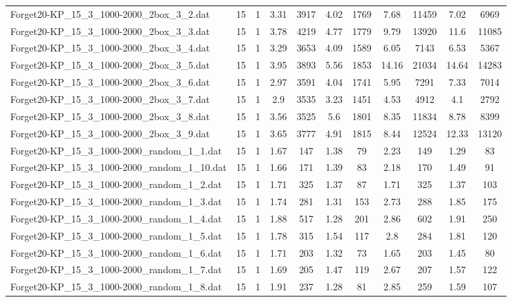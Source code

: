 \begin{table}[!ht]
\begin{tabular}{lcccccccccc}
Forget20-KP\_15\_3\_1000-2000\_2box\_3\_2.dat & 15 & 1 & 3.31 & 3917 & 4.02 & 1769 & 7.68 & 11459 & 7.02 & 6969 \\
Forget20-KP\_15\_3\_1000-2000\_2box\_3\_3.dat & 15 & 1 & 3.78 & 4219 & 4.77 & 1779 & 9.79 & 13920 & 11.6 & 11085 \\
Forget20-KP\_15\_3\_1000-2000\_2box\_3\_4.dat & 15 & 1 & 3.29 & 3653 & 4.09 & 1589 & 6.05 & 7143 & 6.53 & 5367 \\
Forget20-KP\_15\_3\_1000-2000\_2box\_3\_5.dat & 15 & 1 & 3.95 & 3893 & 5.56 & 1853 & 14.16 & 21034 & 14.64 & 14283 \\
Forget20-KP\_15\_3\_1000-2000\_2box\_3\_6.dat & 15 & 1 & 2.97 & 3591 & 4.04 & 1741 & 5.95 & 7291 & 7.33 & 7014 \\
Forget20-KP\_15\_3\_1000-2000\_2box\_3\_7.dat & 15 & 1 & 2.9 & 3535 & 3.23 & 1451 & 4.53 & 4912 & 4.1 & 2792 \\
Forget20-KP\_15\_3\_1000-2000\_2box\_3\_8.dat & 15 & 1 & 3.56 & 3525 & 5.6 & 1801 & 8.35 & 11834 & 8.78 & 8399 \\
Forget20-KP\_15\_3\_1000-2000\_2box\_3\_9.dat & 15 & 1 & 3.65 & 3777 & 4.91 & 1815 & 8.44 & 12524 & 12.33 & 13120 \\
Forget20-KP\_15\_3\_1000-2000\_random\_1\_1.dat & 15 & 1 & 1.67 & 147 & 1.38 & 79 & 2.23 & 149 & 1.29 & 83 \\
Forget20-KP\_15\_3\_1000-2000\_random\_1\_10.dat & 15 & 1 & 1.66 & 171 & 1.39 & 83 & 2.18 & 170 & 1.49 & 91 \\
Forget20-KP\_15\_3\_1000-2000\_random\_1\_2.dat & 15 & 1 & 1.71 & 325 & 1.37 & 87 & 1.71 & 325 & 1.37 & 103 \\
Forget20-KP\_15\_3\_1000-2000\_random\_1\_3.dat & 15 & 1 & 1.74 & 281 & 1.31 & 153 & 2.73 & 288 & 1.85 & 175 \\
Forget20-KP\_15\_3\_1000-2000\_random\_1\_4.dat & 15 & 1 & 1.88 & 517 & 1.28 & 201 & 2.86 & 602 & 1.91 & 250 \\
Forget20-KP\_15\_3\_1000-2000\_random\_1\_5.dat & 15 & 1 & 1.78 & 315 & 1.54 & 117 & 2.8 & 284 & 1.81 & 120 \\
Forget20-KP\_15\_3\_1000-2000\_random\_1\_6.dat & 15 & 1 & 1.71 & 203 & 1.32 & 73 & 1.65 & 203 & 1.45 & 80 \\
Forget20-KP\_15\_3\_1000-2000\_random\_1\_7.dat & 15 & 1 & 1.69 & 205 & 1.47 & 119 & 2.67 & 207 & 1.57 & 122 \\
Forget20-KP\_15\_3\_1000-2000\_random\_1\_8.dat & 15 & 1 & 1.91 & 237 & 1.28 & 81 & 2.85 & 259 & 1.59 & 107 \\

\end{tabular}
\end{table}
